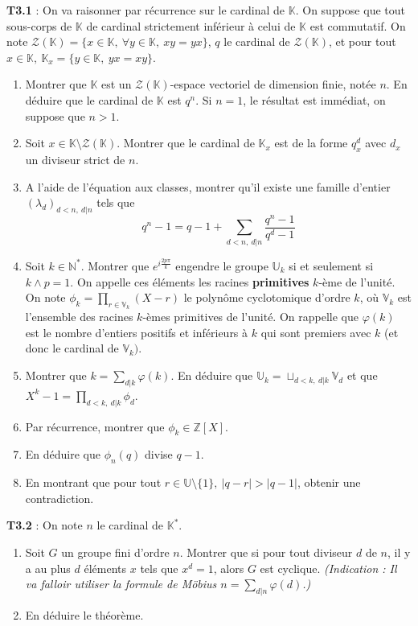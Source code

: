 \documentclass[5pt,a4paper]{article}
\begin{document}
\begin{onehalfspacing}
\textbf{T3.1} : On va raisonner par récurrence sur le cardinal de $\mathbb{K}$.  On suppose que tout sous-corps de $\mathbb{K}$ de cardinal strictement inférieur à celui de $\mathbb{K}$ est commutatif. On note $\mathcal{Z}(\mathbb{K}) = \{x \in \mathbb{K},~\forall y \in \mathbb{K},~xy=yx\}$, $q$ le cardinal de $\mathcal{Z}(\mathbb{K})$, et pour tout $x \in \mathbb{K},~\mathbb{K}_x = \{y \in \mathbb{K},~yx = xy\}$.
\begin{enumerate}
	\item Montrer que $\mathbb{K}$ est un $\mathcal{Z}(\mathbb{K})$-espace vectoriel de dimension finie, notée $n$. En déduire que le cardinal de $\mathbb{K}$ est $q^n$. Si $n = 1$, le résultat est immédiat, on suppose que $n > 1$.
	\item Soit $x \in \mathbb{K} \setminus \mathcal{Z}(\mathbb{K})$. Montrer que le cardinal de $\mathbb{K}_x$ est de la forme $q^d_x$ avec $d_x$ un diviseur strict de $n$.
	\item A l'aide de l'équation aux classes, montrer qu'il existe une famille d'entier $(\lambda_d)_{d < n,~d|n}$ tels que 
	\[q^n - 1 = q - 1 + \sum_{d < n,~d|n} \frac{q^n - 1}{q^d - 1}\]
	\item Soit $k \in \mathbb{N}^*$. Montrer que $e^{i\frac{2p\pi}{k}}$ engendre le groupe $\mathbb{U}_k$ si et seulement si $k \wedge p = 1$. On appelle ces éléments les racines \textbf{primitives} $k$-ème de l'unité. On note $\phi_k = \prod_{r \in \mathbb{V}_k}(X - r)$ le polynôme cyclotomique d'ordre $k$, où $\mathbb{V}_k$ est l'ensemble des racines $k$-èmes primitives de l'unité. On rappelle que $\varphi(k)$ est le nombre d'entiers positifs et inférieurs à $k$ qui sont premiers avec $k$ (et donc le cardinal de $\mathbb{V}_k)$.
	\item Montrer que $k = \sum_{d | k} \varphi(k)$. En déduire que $\mathbb{U}_k = \sqcup_{d < k,~d | k} \mathbb{V}_d$ et que $X^k - 1 = \prod_{d < k,~d|k} \phi_d$. 
	\item Par récurrence, montrer que $\phi_k \in \mathbb{Z}[X]$.
	\item En déduire que $\phi_n(q)$ divise $q - 1$.
	\item En montrant que pour tout $r \in \mathbb{U} \setminus \{1\},~|q-r| > |q-1|$, obtenir une contradiction.
\end{enumerate}

\textbf{T3.2} : On note $n$ le cardinal de $\mathbb{K}^*$. 
\begin{enumerate}
	\item Soit $G$ un groupe fini d'ordre $n$. Montrer que si pour tout diviseur $d$ de $n$, il y a au plus $d$ éléments $x$ tels que $x^d = 1$, alors $G$ est cyclique. \textit{(Indication : Il va falloir utiliser la formule de Möbius $n = \sum_{d | n} \varphi(d)$.)}
	\item En déduire le théorème. 
\end{enumerate}


\end{onehalfspacing}
\end{document}

